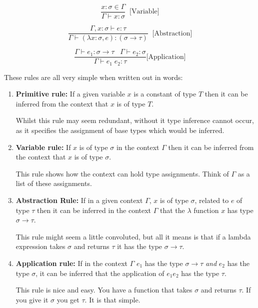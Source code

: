 \documentclass{l4proj}
\begin{document}
\begin{equation*} \label{eq:stlc-var-rule}
    \frac{x:\sigma \in \Gamma}{\Gamma \vdash x:\sigma} \;\;\text{[Variable]}
\end{equation*}

\begin{equation*} \label{eq:stlc-abstraction}
    \frac{\Gamma, x:\sigma \vdash e:\tau}{\Gamma \vdash (\lambda x:\sigma, e): (\sigma \rightarrow \tau)} \;\;\text{[Abstraction]}
\end{equation*}

\begin{equation*} \label{eq:stlc-application}
    \frac{\Gamma \vdash e_1:\sigma\rightarrow\tau \;\;\; \Gamma \vdash e_2:\sigma}{\Gamma \vdash e_1 \; e_2:\tau} \text{[Application]}
\end{equation*}

These rules are all very simple when written out in words:

\begin{enumerate}
    \item \textbf{Primitive rule:} If a given variable $x$ is a constant of type $T$ then it can be inferred from the context that $x$ is of type $T$.
    
    Whilst this rule may seem redundant, without it type inference cannot occur, as it specifies the assignment of base types which would be inferred.
    \item \textbf{Variable rule:} If $x$ is of type $\sigma$ in the context $\Gamma$ then it can be inferred from the context that $x$ is of type $\sigma$.
    
    This rule shows how the context can hold type assignments.
    Think of $\Gamma$ as a list of these assignments.
    \item \textbf{Abstraction Rule:} If in a given context $\Gamma$, $x$ is of type $\sigma$, related to $e$ of type $\tau$ then it can be inferred in the context $\Gamma$ that the $\lambda$ function $x$ has type $\sigma \rightarrow \tau$.
    
    This rule might seem a little convoluted, but all it means is that if a lambda expression takes $\sigma$ and returns $\tau$ it has the type $\sigma \rightarrow \tau$.

    \item \textbf{Application rule:} If in the context $\Gamma$ $e_1$ has the type $\sigma \rightarrow \tau$ \emph{and} $e_2$ has the type $\sigma$, it can be inferred that the application of $e_1 e_2$ has the type $\tau$.
    
    This rule is nice and easy.
    You have a function that takes $\sigma$ and returns $\tau$.
    If you give it $\sigma$ you get $\tau.$
    It is that simple.
\end{enumerate}
\end{document}
